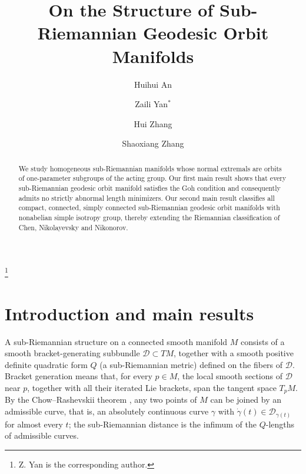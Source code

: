 \documentclass[12pt]{amsart}
\theoremstyle{plain}
\theoremstyle{definition}
\theoremstyle{remark}
\begin{document}
\title{On the Structure of Sub-Riemannian Geodesic Orbit Manifolds}

\author{Huihui An}
\address{School of Mathematics, Liaoning Normal University, Dalian, Liaoning Province, 116029,
People's Republic of China}

\author{Zaili Yan$^{*}$}
\address{School of Mathematics and Statistics, Ningbo University, Ningbo, Zhejiang Province,
315211, People's Republic of China}
\thanks{Z. Yan is the corresponding author.}

\author{Hui Zhang}
\address{School of Mathematics, Southeast University, Nanjing 211189, People's Republic of China}

\author{Shaoxiang Zhang}
\address{College of Mathematics and Systems Science, Shandong University of Science and
Technology, Qingdao 266590, People's Republic of China}

\date{}

\begin{abstract}
We study homogeneous sub-Riemannian manifolds whose normal extremals are orbits of one-parameter
subgroups of the acting group. Our first main result shows that every sub-Riemannian geodesic orbit
manifold satisfies the Goh condition and consequently admits no strictly abnormal length minimizers.
Our second main result classifies all compact, connected, simply connected sub-Riemannian geodesic
orbit manifolds with nonabelian simple isotropy group, thereby extending the Riemannian
classification of Chen, Nikolayevsky and Nikonorov.
\end{abstract}

\maketitle


\tableofcontents

\section{Introduction and main results}\label{sec:intro}

A sub-Riemannian structure on a connected smooth manifold $M$ consists of a smooth
bracket-generating subbundle $\mathcal{D}\subset TM$, together with a smooth positive definite
quadratic form $Q$ (a sub-Riemannian metric) defined on the fibers of $\mathcal{D}$. Bracket
generation means that, for every $p\in M$, the local smooth sections of $\mathcal{D}$ near $p$,
together with all their iterated Lie brackets, span the tangent space $T_pM$. By the
Chow--Rashevskii theorem \cite{Chow,Rashevskii}, any two points of $M$ can be joined by an
admissible curve, that is, an absolutely continuous curve $\gamma$ with
$\dot{\gamma}(t)\in\mathcal{D}_{\gamma(t)}$ for almost every $t$; the sub-Riemannian distance is
the infimum of the $Q$-lengths of admissible curves.
\end{document}
